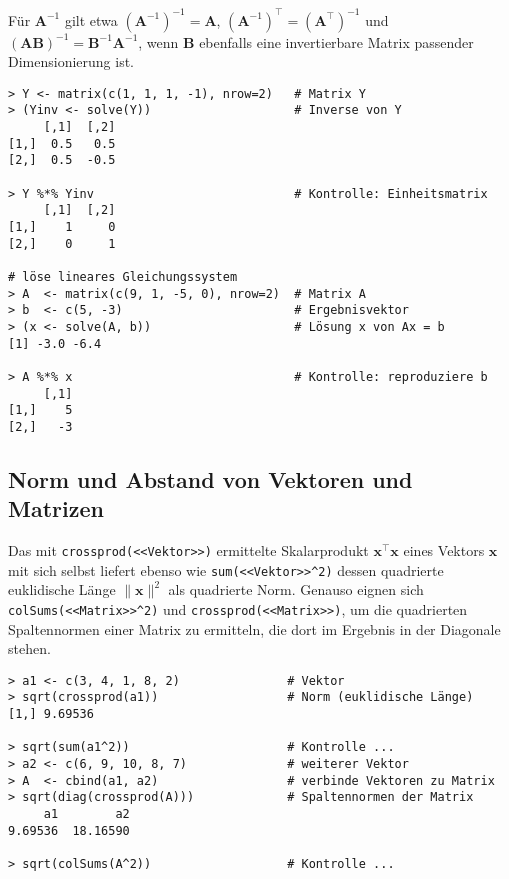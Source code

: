 Für $\bm{A}^{-1}$ gilt etwa $(\bm{A}^{-1})^{-1} = \bm{A}$, $(\bm{A}^{-1})^{\top} = (\bm{A}^{\top})^{-1}$ und $(\bm{A} \bm{B})^{-1} = \bm{B}^{-1} \bm{A}^{-1}$, wenn $\bm{B}$ ebenfalls eine invertierbare Matrix passender Dimensionierung ist.
\begin{lstlisting}
> Y <- matrix(c(1, 1, 1, -1), nrow=2)   # Matrix Y
> (Yinv <- solve(Y))                    # Inverse von Y
     [,1]  [,2]
[1,]  0.5   0.5
[2,]  0.5  -0.5

> Y %*% Yinv                            # Kontrolle: Einheitsmatrix
     [,1]  [,2]
[1,]    1     0
[2,]    0     1

# löse lineares Gleichungssystem
> A  <- matrix(c(9, 1, -5, 0), nrow=2)  # Matrix A
> b  <- c(5, -3)                        # Ergebnisvektor
> (x <- solve(A, b))                    # Lösung x von Ax = b
[1] -3.0 -6.4

> A %*% x                               # Kontrolle: reproduziere b
     [,1]
[1,]    5
[2,]   -3
\end{lstlisting}

\subsection{Norm und Abstand von Vektoren und Matrizen}
\label{sec:matNorm}

Das mit \lstinline!crossprod(<<Vektor>>)! ermittelte Skalarprodukt $\bm{x}^{\top} \bm{x}$ eines Vektors $\bm{x}$ mit sich selbst liefert ebenso wie \lstinline!sum(<<Vektor>>^2)! dessen quadrierte euklidische Länge $\|\bm{x}\|^{2}$ als quadrierte Norm. Genauso eignen sich \lstinline!colSums(<<Matrix>>^2)! und \lstinline!crossprod(<<Matrix>>)!, um die quadrierten Spaltennormen einer Matrix zu ermitteln, die dort im Ergebnis in der Diagonale stehen.
\begin{lstlisting}
> a1 <- c(3, 4, 1, 8, 2)               # Vektor
> sqrt(crossprod(a1))                  # Norm (euklidische Länge)
[1,] 9.69536

> sqrt(sum(a1^2))                      # Kontrolle ...
> a2 <- c(6, 9, 10, 8, 7)              # weiterer Vektor
> A  <- cbind(a1, a2)                  # verbinde Vektoren zu Matrix
> sqrt(diag(crossprod(A)))             # Spaltennormen der Matrix
     a1        a2
9.69536  18.16590

> sqrt(colSums(A^2))                   # Kontrolle ...
\end{lstlisting}

